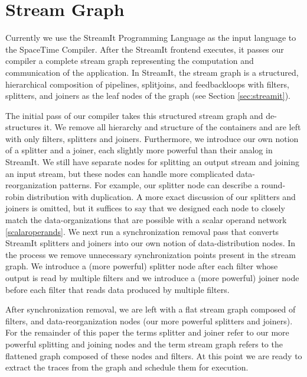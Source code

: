 \section{Stream Graph} 

Currently we use the StreamIt Programming Language as the input
language to the SpaceTime Compiler. After the StreamIt frontend
executes, it passes our compiler a complete stream graph representing
the computation and communication of the application.  In StreamIt,
the stream graph is a structured, hierarchical composition of
pipelines, splitjoins, and feedbackloops with filters, splitters, and
joiners as the leaf nodes of the graph (see Section
\ref{sec:streamit}).

The initial pass of our compiler takes this structured stream graph
and de-structures it.  We remove all hierarchy and structure of the
containers and are left with only filters, splitters and joiners.
Furthermore, we introduce our own notion of a splitter and a joiner,
each slightly more powerful than their analog in StreamIt.  We still
have separate nodes for splitting an output stream and joining an
input stream, but these nodes can handle more complicated
data-reorganization patterns.  For example, our splitter node can
describe a round-robin distribution with duplication.  A more exact
discussion of our splitters and joiners is omitted, but it suffices to
say that we designed each node to closely match the data-organizations
that are possible with a scalar operand network \ref{scalaroperands}.
We next run a synchronization removal pass that converts StreamIt
splitters and joiners into our own notion of data-distribution nodes.
In the process we remove unnecessary synchronization points present in
the stream graph.  We introduce a (more powerful) splitter node after
each filter whose output is read by multiple filters and we introduce
a (more powerful) joiner node before each filter that reads data
produced by multiple filters.

After synchronization removal, we are left with a flat stream graph
composed of filters, and data-reorganization nodes (our more powerful
splitters and joiners).  For the remainder of this paper the terms
splitter and joiner refer to our more powerful splitting and joining
nodes and the term stream graph refers to the flattened graph composed
of these nodes and filters.  At this point we are ready to extract the
traces from the graph and schedule them for execution. 


